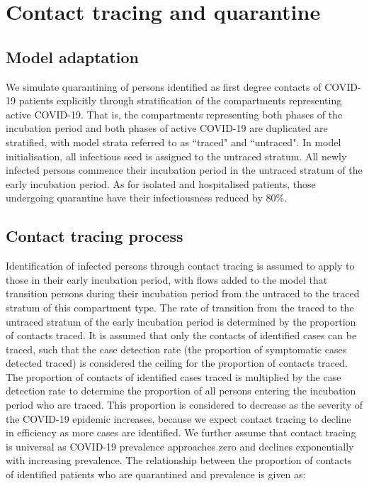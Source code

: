 \section{Contact tracing and quarantine}

\subsection{Model adaptation}
We simulate quarantining of persons identified as first degree contacts of COVID-19 patients explicitly through stratification of the compartments representing active COVID-19.
That is, the compartments representing both phases of the incubation period and both phases of active COVID-19 are duplicated are stratified, with model strata referred to as ``traced" and ``untraced".
In model initialisation, all infectious seed is assigned to the untraced stratum.
All newly infected persons commence their incubation period in the untraced stratum of the early incubation period.
As for isolated and hospitalised patients, those undergoing quarantine have their infectiousness reduced by 80\%.

\subsection{Contact tracing process}
Identification of infected persons through contact tracing is assumed to apply to those in their early incubation period, with flows added to the model that transition persons during their incubation period from the untraced to the traced stratum of this compartment type.
The rate of transition from the traced to the untraced stratum of the early incubation period is determined by the proportion of contacts traced.
It is assumed that only the contacts of identified cases can be traced, such that the case detection rate (the proportion of symptomatic cases detected traced) is considered the ceiling for the proportion of contacts traced.
The proportion of contacts of identified cases traced is multiplied by the case detection rate to determine the proportion of all persons entering the incubation period who are traced.
This proportion is considered to decrease as the severity of the COVID-19 epidemic increases, because we expect contact tracing to decline in efficiency as more cases are identified.
We further assume that contact tracing is universal as COVID-19 prevalence approaches zero and declines exponentially with increasing prevalence.
The relationship between the proportion of contacts of identified patients who are quarantined and prevalence is given as:

